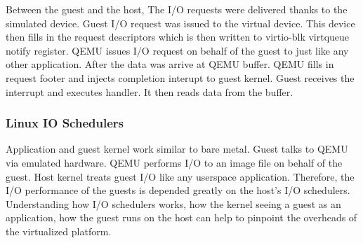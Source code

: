 \documentclass{acmsig}
\begin{document}
  Between the guest and the host, The I/O requests were delivered thanks to the simulated device. Guest I/O request was issued to the virtual device. This device then fills in the request descriptors which is then written to virtio-blk virtqueue notify register. QEMU issues I/O request on behalf of the guest to just like any other application. After the data was arrive at QEMU buffer. QEMU fills in request footer and injects completion interupt to guest kernel. Guest receives the interrupt and executes handler. It then reads data from the buffer.

  \subsubsection{Linux IO Schedulers}

  Application and guest kernel work similar to bare metal. Guest talks to QEMU via emulated hardware. QEMU performs I/O to an image file on behalf of the guest. Host kernel treats guest I/O like any userspace application. Therefore, the I/O performance of the guests is depended greatly on the host's I/O schedulers. Understanding how I/O schedulers works, how the kernel seeing a guest as an application, how the guest runs on the host can help to pinpoint the overheads of the virtualized platform.
\end{document}
